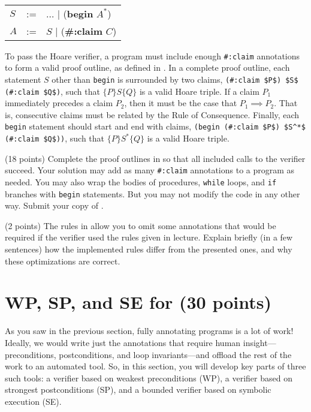 \documentclass{handout}
\begin{document}
{\tt\small
\begin{tabular}{lcl}
$S$ &:=&  $\ldots$ $|$ (\textbf{begin} $A^*$)  \\
$A$ &:=&  $S$ $|$ (\textbf{\#:claim} $C$)\\
\end{tabular}}

To pass the Hoare verifier, a program must include enough \lstinline{#:claim}
annotations to form a valid proof outline, as defined in . In a
complete proof outline, each statement $S$ other than \lstinline{begin} is
surrounded by two claims, \lstinline{(#:claim $P$) $S$ (#:claim $Q$)}, such that
$\{P\}S\{Q\}$ is a valid Hoare triple. If a claim $P_1$ immediately precedes a
claim $P_2$, then it must be the case that $P_1 \implies P_2$. That is,
consecutive claims must be related by the Rule of Consequence. Finally, each
\lstinline{begin} statement should start and end with claims, 
\lstinline{(begin (#:claim $P$) $S^*$ (#:claim $Q$))}, such that 
$\{P\}S^*\{Q\}$ is a valid Hoare triple.


\begin{questions}
\item (18 points) \label{prob:hoare-proofs} Complete the proof outlines in
 so that all included calls to the verifier succeed. Your
solution may add as many \lstinline{#:claim} annotations to a program as needed.
You may also wrap the bodies of procedures, \lstinline{while} loops, and
\lstinline{if} branches with \lstinline{begin} statements. But you may not
modify the code in any other way. Submit your copy of .



\item (2 points) \label{prob:hoare-study} The rules in 
allow you to omit some annotations that would be required if the verifier used
the rules given in lecture. Explain briefly (in a few sentences) how the
implemented rules differ from the presented ones, and why these optimizations
are correct. 



\end{questions}

\section{WP, SP, and SE for \imp (30 points)}\label{sec:imp:wp/sp/se}

As you saw in the previous section, fully annotating programs is a lot of work!
Ideally, we would write just the annotations that require human
insight---preconditions, postconditions, and loop invariants---and offload the
rest of the work to an automated tool. So, in this section, you will develop key
parts of three such tools: a verifier based on weakest preconditions (WP), a
verifier based on strongest postconditions (SP), and a bounded verifier based on
symbolic execution (SE).
\end{document}
